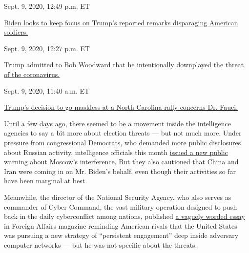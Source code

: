 Sept. 9, 2020, 12:49 p.m. ET

\href{https://www.nytimes3xbfgragh.onion/live/2020/09/09/us/trump-vs-biden\#biden-looks-to-keep-focus-on-trumps-reported-remarks-disparaging-american-soldiers}{Biden
looks to keep focus on Trump's reported remarks disparaging American
soldiers.}\href{https://www.nytimes3xbfgragh.onion/live/2020/09/09/us/trump-vs-biden\#trump-admitted-to-bob-woodward-that-he-intentionally-downplayed-the-threat-of-the-coronavirus}{}

Sept. 9, 2020, 12:27 p.m. ET

\href{https://www.nytimes3xbfgragh.onion/live/2020/09/09/us/trump-vs-biden\#trump-admitted-to-bob-woodward-that-he-intentionally-downplayed-the-threat-of-the-coronavirus}{Trump
admitted to Bob Woodward that he intentionally downplayed the threat of
the
coronavirus.}\href{https://www.nytimes3xbfgragh.onion/live/2020/09/09/us/trump-vs-biden\#trumps-decision-to-go-maskless-at-a-north-carolina-rally-concerns-dr-fauci}{}

Sept. 9, 2020, 11:40 a.m. ET

\href{https://www.nytimes3xbfgragh.onion/live/2020/09/09/us/trump-vs-biden\#trumps-decision-to-go-maskless-at-a-north-carolina-rally-concerns-dr-fauci}{Trump's
decision to go maskless at a North Carolina rally concerns Dr. Fauci.}

Until a few days ago, there seemed to be a movement inside the
intelligence agencies to say a bit more about election threats --- but
not much more. Under pressure from congressional Democrats, who demanded
more public disclosures about Russian activity, intelligence officials
this month
\href{https://www.nytimes3xbfgragh.onion/2020/08/07/us/politics/russia-china-trump-biden-election-interference.html}{issued
a new public warning} about Moscow's interference. But they also
cautioned that China and Iran were coming in on Mr. Biden's behalf, even
though their activities so far have been marginal at best.

Meanwhile, the director of the National Security Agency, who also serves
as commander of Cyber Command, the vast military operation designed to
push back in the daily cyberconflict among nations, published
\href{https://www.foreignaffairs.com/articles/united-states/2020-08-25/cybersecurity}{a
vaguely worded essay} in Foreign Affairs magazine reminding American
rivals that the United States was pursuing a new strategy of
``persistent engagement'' deep inside adversary computer networks ---
but he was not specific about the threats.

